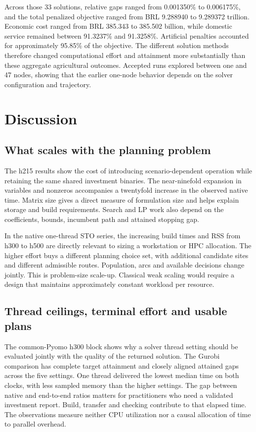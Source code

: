 \documentclass[
  english,
  11pt,
  a4paper,
  authoryear,
  preprint]{elsarticle}
\begin{document}
Across those 33 solutions, relative gaps ranged from 0.001350\% to 0.006175\%, and the total penalized objective ranged from BRL 9.288940 to 9.289372 trillion. Economic cost ranged from BRL 385.343 to 385.502 billion, while domestic service remained between 91.3237\% and 91.3258\%. Artificial penalties accounted for approximately 95.85\% of the objective. The different solution methods therefore changed computational effort and attainment more substantially than these aggregate agricultural outcomes. Accepted runs explored between one and 47 nodes, showing that the earlier one-node behavior depends on the solver configuration and trajectory.

\section{Discussion}\label{discussion}

\subsection{What scales with the planning
problem}\label{what-scales-with-the-planning-problem}

The h215 results show the cost of introducing scenario-dependent
operation while retaining the same shared investment binaries. The
near-ninefold expansion in variables and nonzeros accompanies a
twentyfold increase in the observed native time. Matrix size gives a
direct measure of formulation size and helps explain storage and build
requirements. Search and LP work also depend on the coefficients,
bounds, incumbent path and attained stopping gap.

In the native one-thread STO series, the increasing build times and RSS
from h300 to h500 are directly relevant to sizing a workstation or HPC
allocation. The higher effort buys a different planning choice set, with
additional candidate sites and different admissible routes. Population,
arcs and available decisions change jointly. This is problem-size
scale-up. Classical weak scaling would require a design that maintains
approximately constant workload per resource.

\subsection{Thread ceilings, terminal effort and usable
plans}\label{thread-ceilings-terminal-effort-and-usable-plans}

The common-Pyomo h300 block shows why a solver thread setting should be
evaluated jointly with the quality of the returned solution. The Gurobi
comparison has complete target attainment and closely aligned attained
gaps across the five settings. One thread delivered the lowest median
time on both clocks, with less sampled memory than the higher settings.
The gap between native and end-to-end ratios matters for practitioners
who need a validated investment report. Build, transfer and checking
contribute to that elapsed time. The observations measure neither CPU
utilization nor a causal allocation of time to parallel overhead.
\end{document}
